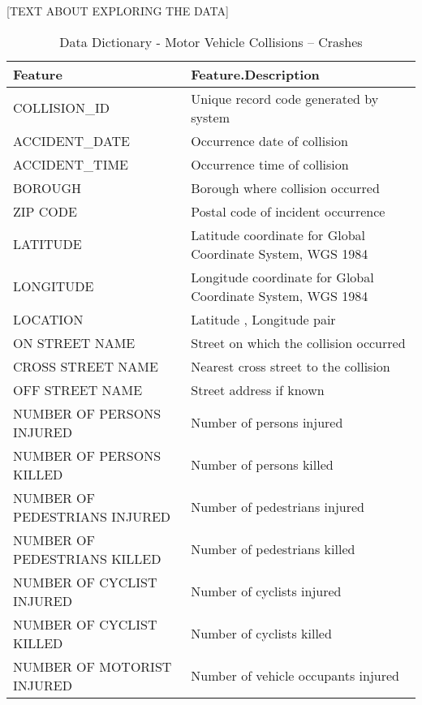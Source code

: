 {[}TEXT ABOUT EXPLORING THE DATA{]}

\begin{Schunk}
\end{Schunk}

\begin{table}

\caption{\label{tab:unnamed-chunk-4}Data Dictionary - Motor Vehicle Collisions – Crashes}
\centering
\begin{tabular}[t]{l|l}
\hline
Feature & Feature.Description\\
\hline
COLLISION\_ID & Unique record code generated by system\\
\hline
ACCIDENT\_DATE & Occurrence date of collision\\
\hline
ACCIDENT\_TIME & Occurrence time of collision\\
\hline
BOROUGH & Borough where collision occurred\\
\hline
ZIP CODE & Postal code of incident occurrence\\
\hline
LATITUDE & Latitude coordinate for Global Coordinate System, WGS 1984\\
\hline
LONGITUDE & Longitude coordinate for Global Coordinate System, WGS 1984\\
\hline
LOCATION & Latitude , Longitude pair\\
\hline
ON STREET NAME & Street on which the collision occurred\\
\hline
CROSS STREET NAME & Nearest cross street to the collision\\
\hline
OFF STREET NAME & Street address if known\\
\hline
NUMBER OF PERSONS INJURED & Number of persons injured\\
\hline
NUMBER OF PERSONS KILLED & Number of persons killed\\
\hline
NUMBER OF PEDESTRIANS INJURED & Number of pedestrians injured\\
\hline
NUMBER OF PEDESTRIANS KILLED & Number of pedestrians killed\\
\hline
NUMBER OF CYCLIST INJURED & Number of cyclists injured\\
\hline
NUMBER OF CYCLIST KILLED & Number of cyclists killed\\
\hline
NUMBER OF MOTORIST INJURED & Number of vehicle occupants injured\\

\end{tabular}
\end{table}

